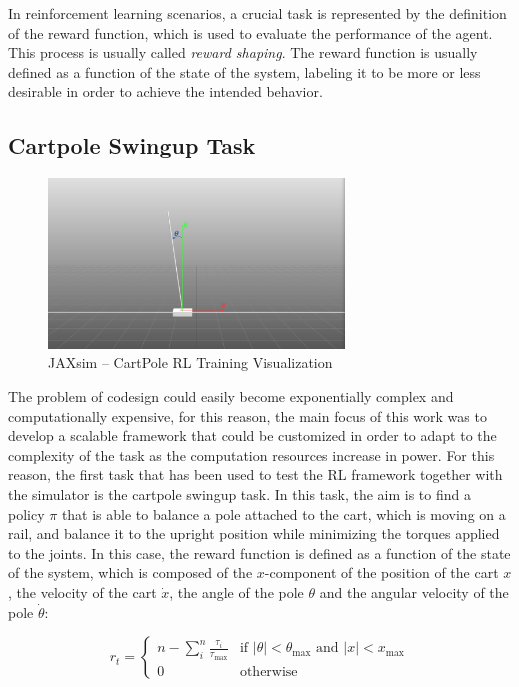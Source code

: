 In reinforcement learning scenarios, a crucial task is represented by the definition of the reward function, which is used to evaluate the performance of the agent. This process is usually called \textit{reward shaping}. The reward function is usually defined as a function of the state of the system, labeling it to be more or less desirable in order to achieve the intended behavior.

\subsection{Cartpole Swingup Task}

\begin{figure}
    \centering
    \caption{JAXsim -- CartPole RL Training Visualization}
    \label{fig:cartpole}
    \includegraphics[width=0.7\textwidth]{Images/cartpole.png}
\end{figure}

The problem of codesign could easily become exponentially complex and computationally expensive, for this reason, the main focus of this work was to develop a scalable framework that could be customized in order to adapt to the complexity of the task as the computation resources increase in power. For this reason, the first task that has been used to test the \ac{RL} framework together with the \jaxsim simulator is the cartpole swingup task. In this task, the aim is to find a policy $\pi$ that is able to balance a pole attached to the cart, which is moving on a rail, and balance it to the upright position while minimizing the torques applied to the joints. In this case, the reward function is defined as a function of the state of the system, which is composed of the $x$-component of the position of the cart $x$, the velocity of the cart $\dot{x}$, the angle of the pole $\theta$ and the angular velocity of the pole $\dot{\theta}$:

\begin{equation}
    r _t = \begin{cases}
        n - \sum _i ^n \frac{\tau _i}{\tau _{\text{max}}} & \text{if } \left| \theta \right| < \theta_{\text{max}} \text{ and } \left| x \right| < x_{\text{max}} \\
        0                                                 & \text{otherwise}
    \end{cases}
\end{equation}

